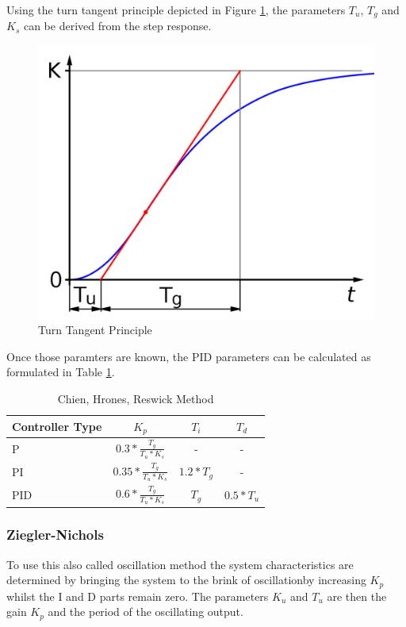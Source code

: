 Using the turn tangent principle depicted in Figure \ref{fig:wendetangentenverfahren}, the parameters $T_u$, $T_g$ and $K_s$ can be derived from the step response.

\begin{figure}[H]
\begin{center}
\includegraphics[width=0.5\linewidth]{images/general/wendetangentenverfahren}
\end{center}
\caption{Turn Tangent Principle}
\label{fig:wendetangentenverfahren}
\end{figure}

Once those paramters are known, the PID parameters can be calculated as formulated in Table \ref{tab:chien}.

\begin{table}[H]
\begin{center}
\begin{tabular}{ l | c | c | c}
  Controller Type & $K_p$ & $T_i$ & $T_d$\\
  \hline
  \hline
  P & $0.3 * \frac{T_g}{T_u * K_s}$& - & -\\
  \hline
  PI & $0.35 * \frac{T_g}{T_u * K_s}$ & $1.2 * T_g$ & - \\
  \hline
  PID & $0.6 * \frac{T_g}{T_u * K_s}$ & $T_g$ & $0.5 * T_u$\\
  \hline
\end{tabular}
\end{center}
\caption{Chien, Hrones, Reswick Method}
\label{tab:chien}
\end{table}

\subsubsection{Ziegler-Nichols}
\label{subs:Ziegler-Nichols}

To use this also called oscillation method the system characteristics are determined by bringing the system to the brink of oscillationby increasing $K_p$ whilst the I and D parts remain zero. The parameters $K_u$ and $T_u$ are then the gain $K_p$ and the period of the oscillating output.

